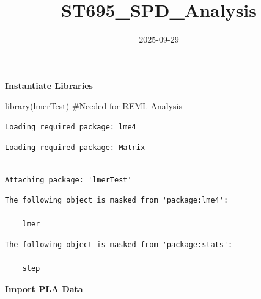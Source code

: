\documentclass[
  letterpaper,
  DIV=11,
  numbers=noendperiod]{scrartcl}
\title{ST695\_SPD\_Analysis}
\author{}
\date{2025-09-29}
\newenvironment{Shaded}{\begin{snugshade}}{\end{snugshade}}
\newcommand{\AttributeTok}[1]{\textcolor[rgb]{0.40,0.45,0.13}{#1}}
\newcommand{\CommentTok}[1]{\textcolor[rgb]{0.37,0.37,0.37}{#1}}
\newcommand{\DecValTok}[1]{\textcolor[rgb]{0.68,0.00,0.00}{#1}}
\newcommand{\FunctionTok}[1]{\textcolor[rgb]{0.28,0.35,0.67}{#1}}
\newcommand{\NormalTok}[1]{\textcolor[rgb]{0.00,0.23,0.31}{#1}}
\newcommand{\OtherTok}[1]{\textcolor[rgb]{0.00,0.23,0.31}{#1}}
\newcommand{\SpecialCharTok}[1]{\textcolor[rgb]{0.37,0.37,0.37}{#1}}
\newcommand{\StringTok}[1]{\textcolor[rgb]{0.13,0.47,0.30}{#1}}
\begin{document}
\maketitle


\textbf{Instantiate Libraries}

\begin{Shaded}
\begin{Highlighting}[]
\FunctionTok{library}\NormalTok{(lmerTest) }\CommentTok{\#Needed for REML Analysis}
\end{Highlighting}
\end{Shaded}

\begin{verbatim}
Loading required package: lme4
\end{verbatim}

\begin{verbatim}
Loading required package: Matrix
\end{verbatim}

\begin{verbatim}

Attaching package: 'lmerTest'
\end{verbatim}

\begin{verbatim}
The following object is masked from 'package:lme4':

    lmer
\end{verbatim}

\begin{verbatim}
The following object is masked from 'package:stats':

    step
\end{verbatim}

\textbf{Import PLA Data}

\begin{Shaded}
\end{Shaded}
\end{document}
